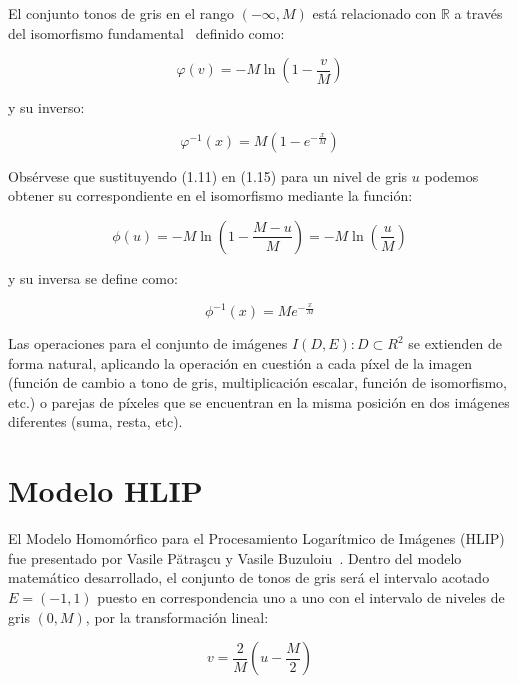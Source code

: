 El conjunto tonos de gris en el rango $(-\infty, M)$ está relacionado con $\mathbb{R}$ a través del isomorfismo fundamental~\cite{jourlin2016logarithmic} definido como:

\begin{equation}
	\varphi(v) = -M\ln\left(1-\frac{v}{M}\right)
\end{equation}

y su inverso:

\begin{equation}
	\varphi^{-1} (x) = M\left(1-e^{-\frac{x}{M}}\right)
\end{equation}


Obs\'ervese que sustituyendo (1.11) en (1.15) para un nivel de gris $u$ podemos obtener su correspondiente en el isomorfismo mediante la funci\'on:

\begin{equation}
	\phi(u) = -M\ln\left(1-\frac{M-u}{M}\right) = -M\ln\left(\frac{u}{M}\right)
\end{equation}

y su inversa se define como:

\begin{equation}
	\phi^{-1}(x) = Me^{-\frac{x}{M}} 
\end{equation}

Las operaciones para el conjunto de im\'agenes $I(D,E):D\subset R^2$ se extienden de forma natural, aplicando la operaci\'on en cuesti\'on a cada p\'ixel de la imagen (funci\'on de cambio a tono de gris, multiplicaci\'on escalar, funci\'on de isomorfismo, etc.) o parejas de p\'ixeles que se encuentran en la misma posici\'on en dos im\'agenes diferentes (suma, resta, etc). 

\section{Modelo HLIP}

El Modelo Homom\'orfico para el Procesamiento Logar\'itmico de Im\'agenes (HLIP) fue presentado por Vasile Pătraşcu y Vasile Buzuloiu~\cite{patrascu2014mathematical}. Dentro del modelo matemático desarrollado, el conjunto de tonos de gris será el intervalo acotado $E = (-1, 1)$ puesto en correspondencia uno a uno con el intervalo de niveles de gris $(0,M)$, por la transformaci\'on lineal:

\begin{equation}
	v=\frac{2}{M}\left(u-\frac{M}{2}\right)
\end{equation}

